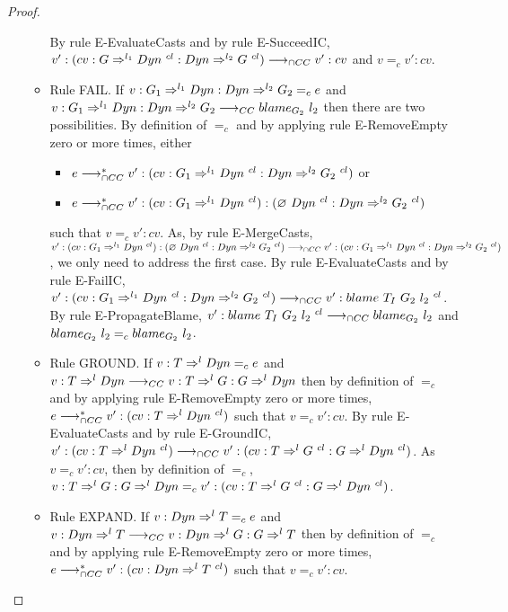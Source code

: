 \documentclass[a4paper]{article}
\begin{document}
\begin{proof}
\begin{itemize}
\begin{itemize}
        By rule E-EvaluateCasts and by rule E-SucceedIC, $v' : (cv : G \Rightarrow^{l_1} Dyn\ ^{cl} : Dyn \Rightarrow^{l_2} G\ ^{cl}) \longrightarrow_{\cap CC} v' : cv$ and $v =_c v' : cv$.
        \item Rule FAIL.
        If $v : G_1 \Rightarrow^{l_1} Dyn : Dyn \Rightarrow^{l_2} G_2 =_c e$ and $v : G_1 \Rightarrow^{l_1} Dyn : Dyn \Rightarrow^{l_2} G_2 \longrightarrow_{CC} blame_{G_2}\ l_2$ then there are two possibilities.
        By definition of $=_c$ and by applying rule E-RemoveEmpty zero or more times, either
        \begin{itemize}
            \item $e \gios^* v' : (cv : G_1 \Rightarrow^{l_1} \Dyn\ ^{cl} : \Dyn \Rightarrow^{l_2} G_2\ ^{cl})$ or
            \item $e \longrightarrow_{\cap CC}^* v' : (cv : G_1 \Rightarrow^{l_1} Dyn\ ^{cl}) : (\varnothing\ Dyn\ ^{cl} : Dyn \Rightarrow^{l_2} G_2\ ^{cl})$
        \end{itemize}
        such that $v =_c v' : cv$.
        As, by rule E-MergeCasts, $v' : (cv : G_1 \Rightarrow^{l_1} Dyn\ ^{cl}) : (\varnothing\ Dyn\ ^{cl} : Dyn \Rightarrow^{l_2} G_2\ ^{cl}) \longrightarrow_{\cap CC} v' : (cv : G_1 \Rightarrow^{l_1} Dyn\ ^{cl} : Dyn \Rightarrow^{l_2} G_2\ ^{cl})$, we only need to address the first case.
        By rule E-EvaluateCasts and by rule E-FailIC, $v' : (cv : G_1 \Rightarrow^{l_1} Dyn\ ^{cl} : Dyn \Rightarrow^{l_2} G_2\ ^{cl}) \longrightarrow_{\cap CC} v' : blame\ T_I\ G_2\ l_2\ ^{cl}$.
        By rule E-PropagateBlame, $v' : blame\ T_I\ G_2\ l_2\ ^{cl} \longrightarrow_{\cap CC} blame_{G_2}\ l_2$ and $blame_{G_2}\ l_2 =_c blame_{G_2}\ l_2$.
        \item Rule GROUND.
        If $v : T \Rightarrow^l Dyn =_c e$ and $v : T \Rightarrow^l Dyn \longrightarrow_{CC} v : T \Rightarrow^l G : G \Rightarrow^l Dyn$ then by definition of $=_c$ and by applying rule E-RemoveEmpty zero or more times, $e \gios^* v' : (cv : T \Rightarrow^l \Dyn\ ^{cl})$ such that $v =_c v' : cv$.
        By rule E-EvaluateCasts and by rule E-GroundIC, $v' : (cv : T \Rightarrow^l Dyn\ ^{cl}) \longrightarrow_{\cap CC} v' : (cv : T \Rightarrow^l G\ ^{cl} : G \Rightarrow^l Dyn\ ^{cl})$.
        As $v =_c v' : cv$, then by definition of $=_c$, $v : T \Rightarrow^l G : G \Rightarrow^l \Dyn =_c v' : (cv : T \Rightarrow^l G\ ^{cl} : G \Rightarrow^l \Dyn\ ^{cl})$.
        \item Rule EXPAND.
        If $v : Dyn \Rightarrow^l T =_c e$ and $v : Dyn \Rightarrow^l T \longrightarrow_{CC} v : Dyn \Rightarrow^l G : G \Rightarrow^l T$ then by definition of $=_c$ and by applying rule E-RemoveEmpty zero or more times, $e \gios^* v' : (cv : \Dyn \Rightarrow^l T\ ^{cl})$ such that $v =_c v' : cv$.

\end{itemize}
\end{itemize}
\end{proof}
\end{document}
